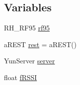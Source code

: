 \subsection*{Variables}
\begin{DoxyCompactItemize}
\item 
R\-H\-\_\-\-R\-F95 \hyperlink{Yun__Dragino__Server__LoRa__WAN_8ino_ac741fa4056d5cbbcc0ab38fa7d8c6ce3}{rf95}
\item 
a\-R\-E\-S\-T \hyperlink{Yun__Dragino__Server__LoRa__WAN_8ino_a26fae33ed4ee26417d9384858ac417f7}{rest} = a\-R\-E\-S\-T()
\item 
Yun\-Server \hyperlink{Yun__Dragino__Server__LoRa__WAN_8ino_a4e0c9ea4f8c666a7b51971ca06aae4e0}{server}
\item 
float \hyperlink{Yun__Dragino__Server__LoRa__WAN_8ino_a362547cac5ea277b474b599314d09815}{f\-R\-S\-S\-I}
\end{DoxyCompactItemize}


